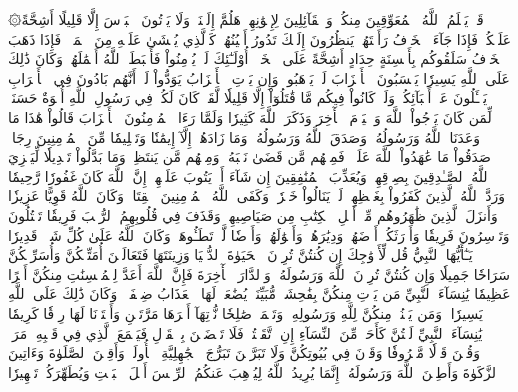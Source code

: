 ۞قَدۡ يَعۡلَمُ ٱللَّهُ ٱلۡمُعَوِّقِينَ مِنكُمۡ وَٱلۡقَآئِلِينَ لِإِخۡوَٰنِهِمۡ هَلُمَّ إِلَيۡنَاۖ وَلَا يَأۡتُونَ ٱلۡبَأۡسَ إِلَّا قَلِيلًا
أَشِحَّةً عَلَيۡكُمۡۖ فَإِذَا جَآءَ ٱلۡخَوۡفُ رَأَيۡتَهُمۡ يَنظُرُونَ إِلَيۡكَ تَدُورُ أَعۡيُنُهُمۡ كَٱلَّذِي يُغۡشَىٰ عَلَيۡهِ مِنَ ٱلۡمَوۡتِۖ فَإِذَا ذَهَبَ ٱلۡخَوۡفُ سَلَقُوكُم بِأَلۡسِنَةٍ حِدَادٍ أَشِحَّةً عَلَى ٱلۡخَيۡرِۚ أُوْلَـٰٓئِكَ لَمۡ يُؤۡمِنُواْ فَأَحۡبَطَ ٱللَّهُ أَعۡمَٰلَهُمۡۚ وَكَانَ ذَٰلِكَ عَلَى ٱللَّهِ يَسِيرٗا
يَحۡسَبُونَ ٱلۡأَحۡزَابَ لَمۡ يَذۡهَبُواْۖ وَإِن يَأۡتِ ٱلۡأَحۡزَابُ يَوَدُّواْ لَوۡ أَنَّهُم بَادُونَ فِي ٱلۡأَعۡرَابِ يَسۡـَٔلُونَ عَنۡ أَنۢبَآئِكُمۡۖ وَلَوۡ كَانُواْ فِيكُم مَّا قَٰتَلُوٓاْ إِلَّا قَلِيلٗا
لَّقَدۡ كَانَ لَكُمۡ فِي رَسُولِ ٱللَّهِ أُسۡوَةٌ حَسَنَةٞ لِّمَن كَانَ يَرۡجُواْ ٱللَّهَ وَٱلۡيَوۡمَ ٱلۡأٓخِرَ وَذَكَرَ ٱللَّهَ كَثِيرٗا
وَلَمَّا رَءَا ٱلۡمُؤۡمِنُونَ ٱلۡأَحۡزَابَ قَالُواْ هَٰذَا مَا وَعَدَنَا ٱللَّهُ وَرَسُولُهُۥ وَصَدَقَ ٱللَّهُ وَرَسُولُهُۥۚ وَمَا زَادَهُمۡ إِلَّآ إِيمَٰنٗا وَتَسۡلِيمٗا
مِّنَ ٱلۡمُؤۡمِنِينَ رِجَالٞ صَدَقُواْ مَا عَٰهَدُواْ ٱللَّهَ عَلَيۡهِۖ فَمِنۡهُم مَّن قَضَىٰ نَحۡبَهُۥ وَمِنۡهُم مَّن يَنتَظِرُۖ وَمَا بَدَّلُواْ تَبۡدِيلٗا
لِّيَجۡزِيَ ٱللَّهُ ٱلصَّـٰدِقِينَ بِصِدۡقِهِمۡ وَيُعَذِّبَ ٱلۡمُنَٰفِقِينَ إِن شَآءَ أَوۡ يَتُوبَ عَلَيۡهِمۡۚ إِنَّ ٱللَّهَ كَانَ غَفُورٗا رَّحِيمٗا
وَرَدَّ ٱللَّهُ ٱلَّذِينَ كَفَرُواْ بِغَيۡظِهِمۡ لَمۡ يَنَالُواْ خَيۡرٗاۚ وَكَفَى ٱللَّهُ ٱلۡمُؤۡمِنِينَ ٱلۡقِتَالَۚ وَكَانَ ٱللَّهُ قَوِيًّا عَزِيزٗا
وَأَنزَلَ ٱلَّذِينَ ظَٰهَرُوهُم مِّنۡ أَهۡلِ ٱلۡكِتَٰبِ مِن صَيَاصِيهِمۡ وَقَذَفَ فِي قُلُوبِهِمُ ٱلرُّعۡبَ فَرِيقٗا تَقۡتُلُونَ وَتَأۡسِرُونَ فَرِيقٗا
وَأَوۡرَثَكُمۡ أَرۡضَهُمۡ وَدِيَٰرَهُمۡ وَأَمۡوَٰلَهُمۡ وَأَرۡضٗا لَّمۡ تَطَـُٔوهَاۚ وَكَانَ ٱللَّهُ عَلَىٰ كُلِّ شَيۡءٖ قَدِيرٗا
يَـٰٓأَيُّهَا ٱلنَّبِيُّ قُل لِّأَزۡوَٰجِكَ إِن كُنتُنَّ تُرِدۡنَ ٱلۡحَيَوٰةَ ٱلدُّنۡيَا وَزِينَتَهَا فَتَعَالَيۡنَ أُمَتِّعۡكُنَّ وَأُسَرِّحۡكُنَّ سَرَاحٗا جَمِيلٗا
وَإِن كُنتُنَّ تُرِدۡنَ ٱللَّهَ وَرَسُولَهُۥ وَٱلدَّارَ ٱلۡأٓخِرَةَ فَإِنَّ ٱللَّهَ أَعَدَّ لِلۡمُحۡسِنَٰتِ مِنكُنَّ أَجۡرًا عَظِيمٗا
يَٰنِسَآءَ ٱلنَّبِيِّ مَن يَأۡتِ مِنكُنَّ بِفَٰحِشَةٖ مُّبَيِّنَةٖ يُضَٰعَفۡ لَهَا ٱلۡعَذَابُ ضِعۡفَيۡنِۚ وَكَانَ ذَٰلِكَ عَلَى ٱللَّهِ يَسِيرٗا
۞وَمَن يَقۡنُتۡ مِنكُنَّ لِلَّهِ وَرَسُولِهِۦ وَتَعۡمَلۡ صَٰلِحٗا نُّؤۡتِهَآ أَجۡرَهَا مَرَّتَيۡنِ وَأَعۡتَدۡنَا لَهَا رِزۡقٗا كَرِيمٗا
يَٰنِسَآءَ ٱلنَّبِيِّ لَسۡتُنَّ كَأَحَدٖ مِّنَ ٱلنِّسَآءِ إِنِ ٱتَّقَيۡتُنَّۚ فَلَا تَخۡضَعۡنَ بِٱلۡقَوۡلِ فَيَطۡمَعَ ٱلَّذِي فِي قَلۡبِهِۦ مَرَضٞ وَقُلۡنَ قَوۡلٗا مَّعۡرُوفٗا
وَقَرۡنَ فِي بُيُوتِكُنَّ وَلَا تَبَرَّجۡنَ تَبَرُّجَ ٱلۡجَٰهِلِيَّةِ ٱلۡأُولَىٰۖ وَأَقِمۡنَ ٱلصَّلَوٰةَ وَءَاتِينَ ٱلزَّكَوٰةَ وَأَطِعۡنَ ٱللَّهَ وَرَسُولَهُۥٓۚ إِنَّمَا يُرِيدُ ٱللَّهُ لِيُذۡهِبَ عَنكُمُ ٱلرِّجۡسَ أَهۡلَ ٱلۡبَيۡتِ وَيُطَهِّرَكُمۡ تَطۡهِيرٗا
